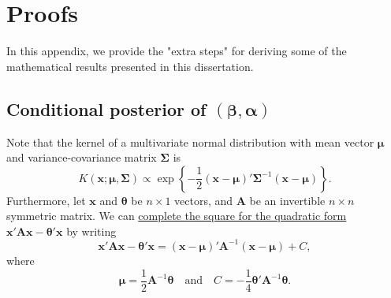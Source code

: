 \documentclass[cmfont,usenames,dvipsnames,leqno]{afit-etd}\usepackage[]{graphicx}\usepackage[]{color}
\begin{document}


\appendix  	%

\chapter{Proofs}
\label{app:proofs}
In this appendix, we provide the "extra steps" for deriving some of the mathematical results presented in this dissertation.

\section{Conditional posterior of \texorpdfstring{$\left(\boldsymbol{\beta}, \boldsymbol{\alpha}\right)$}{polynomial and spline coefficients}}
\label{sec:conditional-theta}
Note that the kernel of a multivariate normal distribution with mean vector $\boldsymbol{\mu}$ and variance-covariance matrix $\boldsymbol{\Sigma}$ is 
\begin{equation*}
  K\left(\boldsymbol{x}; \boldsymbol{\mu}, \boldsymbol{\Sigma}\right) \propto \exp\left\{-\frac{1}{2}\left(\boldsymbol{x}-\boldsymbol{\mu}\right)'\boldsymbol{\Sigma}^{-1}\left(\boldsymbol{x}-\boldsymbol{\mu}\right)\right\}.
\end{equation*}
Furthermore, let $\boldsymbol{x}$ and $\boldsymbol{\theta}$ be $n \times 1$ vectors, and  $\boldsymbol{A}$ be an invertible $n \times n$ symmetric matrix. We can \href{http://en.wikipedia.org/wiki/Completing_the_square}{complete the square for the quadratic form} $\boldsymbol{x}'\boldsymbol{A}\boldsymbol{x} - \boldsymbol{\theta}'\boldsymbol{x}$ by writing
\begin{equation*}
  \boldsymbol{x}'\boldsymbol{A}\boldsymbol{x} - \boldsymbol{\theta}'\boldsymbol{x} = \left(\boldsymbol{x}-\boldsymbol{\mu}\right)'\boldsymbol{A}^{-1}\left(\boldsymbol{x}-\boldsymbol{\mu}\right) + C,
\end{equation*}
where 
\begin{equation*}
  \boldsymbol{\mu} = \frac{1}{2}\boldsymbol{A}^{-1}\boldsymbol{\theta} \quad \text{and} \quad C = -\frac{1}{4}\boldsymbol{\theta}'\boldsymbol{A}^{-1}\boldsymbol{\theta}.
\end{equation*}
\end{document}
